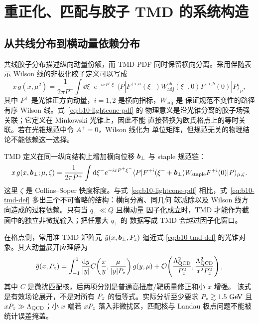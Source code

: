 \chapter{重正化、匹配与胶子 TMD 的系统构造}

\section{从共线分布到横动量依赖分布}

共线胶子分布描述纵向动量份额，而 TMD-PDF 同时保留横向分离。采用伴随表示
Wilson 线的非极化胶子定义可以写成
\begin{equation}
  x\,g(x,\mu^2)
  =\frac{1}{2\pi P^+}\int \dd\xi^- e^{-ixP^+\xi^-}
  \langle P|F^{+i,a}(\xi^-)W^{ab}_{\mathrm{adj}}(\xi^-,0)
  F^{+i,b}(0)|P\rangle_{\mu},
  \label{eq:b10-lightcone-pdf}
\end{equation}
其中 $P^+$ 是光锥正方向动量，$i=1,2$ 是横向指标，$W_{\mathrm{adj}}$ 是
保证规范不变性的路径有序 Wilson 线。式~\eqref{eq:b10-lightcone-pdf} 的
物理意义是沿光锥分离的胶子场强关联；它定义在 Minkowski 光锥上，因此不能
直接替换为欧氏格点上的等时关联。若在光锥规范中令 $A^+=0$，Wilson 线化为
单位矩阵，但规范无关的物理结论不能依赖这一选择。

TMD 定义在同一纵向结构上增加横向位移 $\boldsymbol b_\perp$ 与 staple 规范链：
\begin{equation}
  x\,g(x,\boldsymbol b_\perp;\mu,\zeta)
  =\frac{1}{2\pi P^+}\int \mathrm{d}\xi^- e^{-ixP^+\xi^-}
  \langle P|F^{+i}(\xi^-+\boldsymbol b_\perp)W_{\mathrm{staple}}
  F^{+i}(0)|P\rangle_{\mu,\zeta}.
  \label{eq:b10-tmd-def}
\end{equation}
这里 $\zeta$ 是 Collins--Soper 快度标度。与式~\eqref{eq:b10-lightcone-pdf}
相比，式~\eqref{eq:b10-tmd-def} 多出三个不可省略的结构：横向分离、同几何
软减除以及 Wilson 线方向造成的过程依赖。只有当 $q_\perp\ll Q$ 且横动量
因子化成立时，TMD 才能作为截面中的独立非微扰输入；把任意大 $q_\perp$ 的
数据写成 TMD 会越过因子化窗口。

在格点侧，常用准 TMD 矩阵元 $\tilde g(x,\boldsymbol b_\perp,P_z)$ 逼近式
\eqref{eq:b10-tmd-def} 的光锥对象。其大动量展开应理解为
\begin{equation}
  \tilde g(x,P_z)
  =\int_{-1}^{1}\frac{\mathrm{d} y}{|y|}
  C\!\left(\frac{x}{y},\frac{\mu}{|y|P_z}\right)g(y,\mu)
  +\mathcal O\!\left(\frac{\Lambda_{\rm QCD}^2}{P_z^2},
  \frac{\Lambda_{\rm QCD}^2}{x^2P_z^2}\right),
  \label{eq:b10-lamet}
\end{equation}
其中 $C$ 是微扰匹配核，后两项分别是普通高扭度/靶质量修正和小 $x$ 增强。
该式是有效场论展开，不是对所有 $P_z$ 的恒等式。实际分析至少要求
$P_z\gtrsim1.5~\mathrm{GeV}$ 且 $xP_z\gg\Lambda_{\rm QCD}$；小 $x$ 端若
$xP_z$ 落入非微扰区，匹配核与 Landau 极点问题不能被统计误差掩盖。


